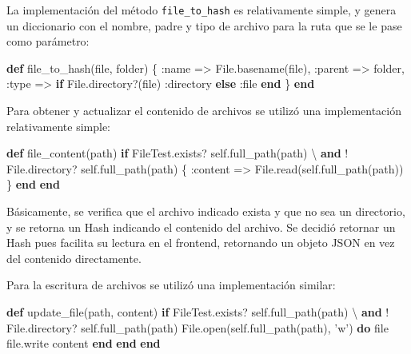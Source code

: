 \documentclass[12pt,spanish,letter]{report}
\newenvironment{Shaded}{}{}
\newcommand{\KeywordTok}[1]{\textcolor[rgb]{0.00,0.44,0.13}{\textbf{{#1}}}}
\newcommand{\DataTypeTok}[1]{\textcolor[rgb]{0.56,0.13,0.00}{{#1}}}
\newcommand{\DecValTok}[1]{\textcolor[rgb]{0.25,0.63,0.44}{{#1}}}
\newcommand{\StringTok}[1]{\textcolor[rgb]{0.25,0.44,0.63}{{#1}}}
\newcommand{\NormalTok}[1]{{#1}}
\begin{document}
La implementación del método \texttt{file\_to\_hash} es relativamente
simple, y genera un diccionario con el nombre, padre y tipo de archivo
para la ruta que se le pase como parámetro:

\begin{Shaded}
\begin{Highlighting}[]
\KeywordTok{def} \NormalTok{file_to_hash(file, folder)}
  \NormalTok{\{}
    \StringTok{:name} \NormalTok{=> }\DataTypeTok{File}\NormalTok{.basename(file),}
    \StringTok{:parent} \NormalTok{=> folder,}
    \StringTok{:type} \NormalTok{=> }\KeywordTok{if} \DataTypeTok{File}\NormalTok{.directory?(file)}
      \StringTok{:directory}
    \KeywordTok{else}
      \StringTok{:file}
    \KeywordTok{end}
  \NormalTok{\}}
\KeywordTok{end}
\end{Highlighting}
\end{Shaded}

Para obtener y actualizar el contenido de archivos se utilizó una
implementación relativamente simple:

\begin{Shaded}
\begin{Highlighting}[]
\KeywordTok{def} \NormalTok{file_content(path)}
  \KeywordTok{if} \DataTypeTok{FileTest}\NormalTok{.exists? }\DecValTok{self}\NormalTok{.full_path(path) \textbackslash{}}
     \KeywordTok{and}\NormalTok{ ! }\DataTypeTok{File}\NormalTok{.directory? }\DecValTok{self}\NormalTok{.full_path(path)}
    \NormalTok{\{}
      \StringTok{:content} \NormalTok{=> }\DataTypeTok{File}\NormalTok{.read(}\DecValTok{self}\NormalTok{.full_path(path))}
    \NormalTok{\}}
  \KeywordTok{end}
\KeywordTok{end}
\end{Highlighting}
\end{Shaded}

Básicamente, se verifica que el archivo indicado exista y que no sea un
directorio, y se retorna un Hash indicando el contenido del archivo. Se
decidió retornar un Hash pues facilita su lectura en el frontend,
retornando un objeto JSON en vez del contenido directamente.

Para la escritura de archivos se utilizó una implementación similar:

\begin{Shaded}
\begin{Highlighting}[]
\KeywordTok{def} \NormalTok{update_file(path, content)}
  \KeywordTok{if} \DataTypeTok{FileTest}\NormalTok{.exists? }\DecValTok{self}\NormalTok{.full_path(path) \textbackslash{}}
     \KeywordTok{and}\NormalTok{ ! }\DataTypeTok{File}\NormalTok{.directory? }\DecValTok{self}\NormalTok{.full_path(path)}
    \DataTypeTok{File}\NormalTok{.open(}\DecValTok{self}\NormalTok{.full_path(path), }\StringTok{'w'}\NormalTok{) }\KeywordTok{do} \NormalTok{\textbar{}file\textbar{}}
      \NormalTok{file.write content}
    \KeywordTok{end}
  \KeywordTok{end}
\KeywordTok{end}
\end{Highlighting}
\end{Shaded}
\end{document}

